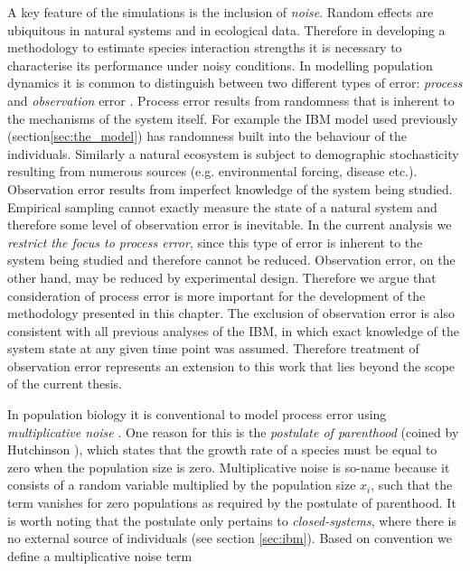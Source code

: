 A key feature of the simulations is the inclusion of \emph{noise}. Random effects are ubiquitous in natural systems and in ecological data. Therefore in developing a methodology to estimate species interaction strengths it is necessary to characterise its performance under noisy conditions. In modelling population dynamics it is common to distinguish between two different types of error: \emph{process} and \emph{observation} error \cite{hastings2012encyclopedia,jost2000identifying}. Process error results from randomness that is inherent to the mechanisms of the system itself. For example the IBM model used previously (section\ref{sec:the_model}) has randomness built into the behaviour of the individuals. Similarly a natural ecosystem is subject to demographic stochasticity resulting from numerous sources (e.g. environmental forcing, disease etc.). Observation error results from imperfect knowledge of the system being studied. Empirical sampling cannot exactly measure the state of a natural system and therefore some level of observation error is inevitable. In the current analysis we \emph{restrict the focus to process error}, since this type of error is inherent to the system being studied and therefore cannot be reduced. Observation error, on the other hand, may be reduced by experimental design. Therefore we argue that consideration of process error is more important for the development of the methodology presented in this chapter. The exclusion of observation error is also consistent with all previous analyses of the IBM, in which exact knowledge of the system state at any given time point was assumed. Therefore treatment of observation error represents an extension to this work that lies beyond the scope of the current thesis.

In population biology it is conventional to model process error using \emph{multiplicative noise} \cite{carpenter1994fitting,jost2000identifying}. One reason for this is the \emph{postulate of parenthood} (coined by Hutchinson \cite{hutchinson1978introduction}), which states that the growth rate of a species must be equal to zero when the population size is zero. Multiplicative noise is so-name because it consists of a random variable multiplied by the population size $x_i$, such that the term vanishes for zero populations as required by the postulate of parenthood. It is worth noting that the postulate only pertains to \emph{closed-systems}, where there is no external source of individuals (see section \ref{sec:ibm}). Based on convention \cite{jost2000identifying} we define a multiplicative noise term

